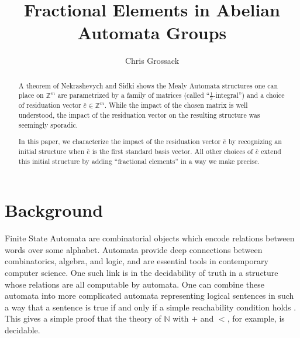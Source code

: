 \documentclass[final]{ws-ijac}
\title{Fractional Elements in Abelian Automata Groups}
\author{Chris Grossack}
\newcommand{\Z}{\mathbb{Z}}
\newcommand{\2}{\textbf{2}}
\newcommand{\e}{\bar{e}}
\begin{document}
\maketitle

\begin{abstract}
  A theorem of Nekrashevych and Sidki shows the Mealy Automata
  structures one can place on $\Z^m$ are parametrized by a family of
  matrices (called ``$\frac{1}{2}$-integral'') and a choice of 
  residuation vector $\e \in \Z^m$. While the impact of the chosen 
  matrix is well understood, the impact of the residuation vector on the
  resulting structure was seemingly sporadic. 

  In this paper, we characterize the impact of the residuation vector $\e$
  by recognizing an initial structure when $\e$ is the first standard basis 
  vector. All other choices of $\e$ extend this initial structure by adding
  ``fractional elements'' in a way we make precise. 

\end{abstract}

\section{Background}
Finite State Automata are combinatorial objects which encode relations 
between words over some alphabet. Automata provide deep connections between
combinatorics, algebra, and logic, and are essential tools in contemporary 
computer science. One such link is in the decidability of truth in a structure
whose relations are all computable by automata. One can combine these automata 
into more complicated automata representing logical sentences in such a way 
that a sentence is true if and only if a simple reachability condition holds
\cite{Brny07:automatic_structures}. This gives a simple proof that the theory 
of $\mathbb{N}$ with $+$ and $<$, for example, is decidable.
\end{document}
